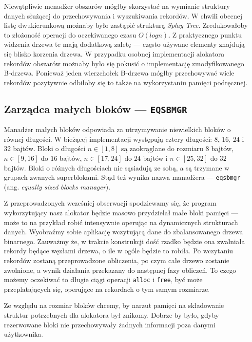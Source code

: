 \documentclass[12pt,a4paper,titlepage,twoside]{mwart}
\begin{document}
Niewątpliwie menadżer obszarów mógłby skorzystać na wymianie struktury danych
służącej do przechowywania i wyszukiwania rekordów. W chwili obecnej listę
dwukierunkową możnaby było zastąpić strukturą \textit{Splay Tree}.
Zredukowałoby to złożoność operacji do oczekiwanego czasu $O(log n)$. Z
praktycznego punktu widzenia drzewa te mają dodatkową zaletę --- często używane
elementy znajdują się blisko korzenia drzewa. W przypadku osobnej implementacji
alokatora rekordów obszarów możnaby było się pokusić o implementację
zmodyfikowanego B-drzewa.  Ponieważ jeden wierzchołek B-drzewa mógłby
przechowywać wiele rekordów pozytywnie odbiłoby się to także na wykorzystaniu
pamięci podręcznej.

\newpage

\subsection{Zarządca małych bloków --- \texttt{EQSBMGR}}

Manadżer małych bloków odpowiada za utrzymywanie niewielkich bloków o równej
długości. W bieżącej implementacji występują cztery długości: $8$, $16$, $24$ i
$32$ bajtów. Bloki o długości $n \in [1,8]$ są zaokrąglane do rozmiaru $8$
bajtów, $n \in [9,16]$ do $16$ bajtów, $n \in [17,24]$ do $24$ bajtów i $n \in
[25,32]$ do $32$ bajtów. Bloki o różnych długościach nie sąsiadują ze sobą, a
są trzymane w grupach zwanych superblokami. Stąd też wynika nazwa manadżera ---
\texttt{eqsbmgr} (ang. \textit{equally sized blocks manager}).

Z przeprowadzonych wcześniej obserwacji spodziewamy się, że program
wykorzytujący nasz alokator będzie masowo przydzielał małe bloki pamięci ---
może to na przykład robić intensywnie operując na dynamicznych strukturach danych.
Wyobraźmy sobie aplikację wczytującą dane do zbalansowanego drzewa binarnego.
Zauważmy że, w trakcie konstrukcji dość rzadko będzie ona zwalniała rekordy
będące węzłami drzewa, o ile w ogóle będzie to robiła. Po wczytaniu rekordów
zostaną przeprowadzone obliczenia, po czym całe drzewo zostanie zwolnione, a
wynik działania przekazany do następnej fazy obliczeń. To czego możemy
oczekiwać to długie ciągi operacji \texttt{alloc} i \texttt{free}, być może
przeplatających się, operujące na rekordach o tym samym rozmiarze.

Ze względu na rozmiar bloków chcemy, by narzut pamięci na składowanie struktur
potrzebnych dla alokatora był znikomy. Dobrze by było, gdyby rezerwowane bloki
nie przechowywały żadnych informacji poza danymi użytkownika.
\end{document}
